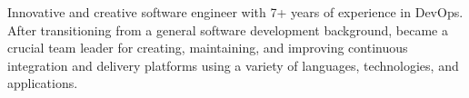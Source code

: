 \textcolor{awesome}{\raisebox{0.1\height}{\faBook\thinspace}}


\begin{cvparagraph}

Innovative and creative software engineer with 7+ years of experience in DevOps. After transitioning from a general software development background, became a crucial team leader for creating, maintaining, and improving continuous integration and delivery platforms using a variety of languages, technologies, and applications.
\end{cvparagraph}
